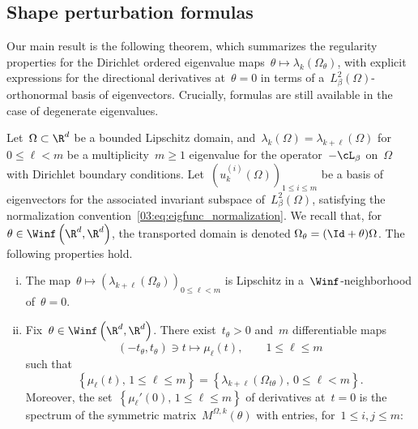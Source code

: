     \subsection{Shape perturbation formulas}
    \label{03:subsec:shape_perturbation_formulas}
    Our main result is the following theorem, which summarizes the regularity properties for the Dirichlet ordered eigenvalue maps~$\theta\mapsto \lambda_k(\Omega_\theta)$, with explicit expressions for the directional derivatives at~$\theta=0$ in terms of a~$L^2_\beta(\Omega)$-orthonormal basis of eigenvectors.
    Crucially, formulas are still available in the case of degenerate eigenvalues.
\begin{theorem}
    \label{03:thm:gateaux_differentiability}
    Let~$\Omega\subset \R^d$ be a bounded Lipschitz domain, and~$\lambda_k(\Omega)=\lambda_{k+\ell}(\Omega)$ for~$0\leq \ell < m$ be a  multiplicity~$m\geq 1$ eigenvalue for the operator~$-\cL_\beta$ on~$\Omega$ with Dirichlet boundary conditions. Let~$\left(u_k^{(i)}(\Omega)\right)_{1\leq i\leq m}$ be a basis of eigenvectors for the associated invariant subspace of~$L^2_\beta(\Omega)$, satisfying the normalization convention~\eqref{03:eq:eigfunc_normalization}.
    We recall that, for~$\theta\in\Winf\left(\R^d,\R^d\right)$, the transported domain is denoted $\Omega_\theta = (\Id+\theta)\Omega$. The following properties hold.
        \begin{enumerate}[i)]
        \item{
        The map~$\theta\mapsto \left(\lambda_{k+\ell}(\Omega_\theta)\right)_{0\leq \ell < m}$
        is Lipschitz in a~$\Winf$-neighborhood of~$\theta=0$.
        }
        \item{
        Fix~$\theta\in\Winf\left(\R^d,\R^d\right)$. There exist~$t_\theta>0$ and~$m$ differentiable maps
        \begin{equation}
            (-t_\theta,t_\theta)\ni t \mapsto \mu_\ell(t),\qquad 1\leq \ell\leq m
        \end{equation}
        such that~
        \begin{equation}
            \label{03:eq:multiset}
            \left\{\mu_\ell(t),\,1\leq \ell\leq m\right\} = \left\{ \lambda_{k+\ell}(\Omega_{t\theta}),\,0\leq \ell<m\right\}.
        \end{equation}
        Moreover, the set~$\left\{\mu_\ell'(0),\,1\leq \ell\leq m\right\}$ of derivatives at~$t=0$ is the spectrum of the symmetric matrix~$M^{\Omega,k}(\theta)$ with entries, for~$1\leq i,j\leq m$:
        \begin{equation}

\end{equation}}
\end{enumerate}
\end{theorem}
